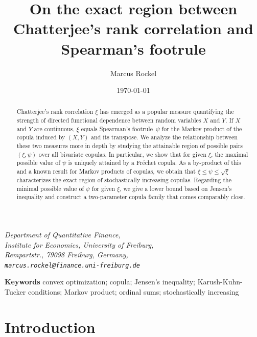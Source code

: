 \documentclass{article}
\title{\textbf{On the exact region between Chatterjee's rank correlation and Spearman's footrule}}
\author{Marcus Rockel}
\date{\today}
\newcommand{\1}{\mathds{1}}
\providecommand{\keywords}[1]{\textbf{Keywords } #1}
\begin{document}
\maketitle
\begin{center}
	\small\textit{
		Department of Quantitative Finance,\\
		Institute for Economics, University of Freiburg,\\
		Rempartstr., 79098 Freiburg, Germany,\\
        \texttt{marcus.rockel@finance.uni-freiburg.de} \\[2mm]
	}
\end{center}
\begin{abstract}
Chatterjee's rank correlation \(\xi\) has emerged as a popular measure quantifying the strength of directed functional dependence between random variables $X$ and $Y$.
If $X$ and $Y$ are continuous, $\xi$ equals Spearman's footrule~\(\psi\) for the Markov product of the copula induced by $(X,Y)$ and its transpose.
We analyze the relationship between these two measures more in depth by studying the attainable region of possible pairs \((\xi, \psi)\) over all bivariate copulas.
In particular, we show that for given $\xi$, the maximal possible value of $\psi$ is uniquely attained by a Fréchet copula.
As a by-product of this and a known result for Markov products of copulas, we obtain that \(\xi\le\psi\le \sqrt{\xi}\) characterizes the exact region of stochastically increasing copulas.
Regarding the minimal possible value of \(\psi\) for given \(\xi\), we give a lower bound based on Jensen's inequality and construct a two-parameter copula family that comes comparably close.
\end{abstract} 
\vspace{0ex}
\keywords{convex optimization; copula; Jensen's inequality; Karush-Kuhn-Tucker conditions; Markov product; ordinal sums; stochastically increasing}

\section{Introduction}
\label{sec:intro}
\end{document}

